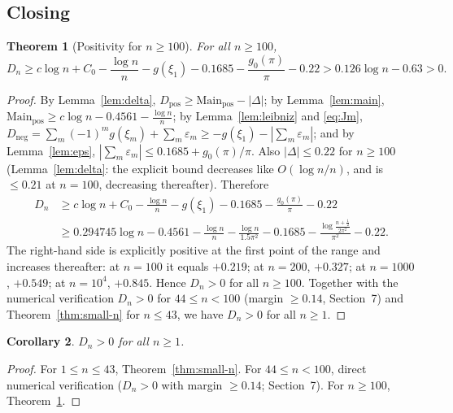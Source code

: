 \documentclass[11pt]{article}
\newtheorem{theorem}{Theorem}[section]
\newtheorem{corollary}[theorem]{Corollary}
\begin{document}
\subsection{Closing}
\label{sec:close}

\begin{theorem}[Positivity for $n\ge100$]
\label{thm:large-n}
For all $n\ge100$,
\begin{equation}\label{eq:close}
D_n\ge c\log n+C_0-\frac{\log n}{n}-g(\xi_1)-0.1685-\frac{g_0(\pi)}{\pi}-0.22
>0.126\log n-0.63>0.
\end{equation}
\end{theorem}

\begin{proof}
By Lemma~\ref{lem:delta}, $D_{\mathrm{pos}}\ge\mathrm{Main}_{\mathrm{pos}}-|\Delta|$; by
Lemma~\ref{lem:main}, $\mathrm{Main}_{\mathrm{pos}}\ge c\log n-0.4561-\frac{\log n}{n}$; by
Lemma~\ref{lem:leibniz} and \eqref{eq:Jm},
$D_{\mathrm{neg}}=\sum_m(-1)^m g(\xi_m)+\sum_m\varepsilon_m\ge-g(\xi_1)-|\sum_m\varepsilon_m|$;
and by Lemma~\ref{lem:eps}, $|\sum_m\varepsilon_m|\le0.1685+g_0(\pi)/\pi$. Also
$|\Delta|\le0.22$ for $n\ge100$ (Lemma~\ref{lem:delta}: the explicit bound decreases like
$O(\log n/n)$, and is $\le0.21$ at $n=100$, decreasing thereafter). Therefore
\begin{align*}
D_n&\ge c\log n+C_0-\frac{\log n}{n}-g(\xi_1)-0.1685-\frac{g_0(\pi)}{\pi}-0.22\\
&\ge0.294745\log n-0.4561-\frac{\log n}{n}-\frac{\log n}{1.5\pi^2}
-0.1685-\frac{\log\frac{n+\frac12}{2\pi^2}}{\pi^2}-0.22.
\end{align*}
The right-hand side is explicitly positive at the first point of the range and increases
thereafter: at $n=100$ it equals $+0.219$; at $n=200$, $+0.327$; at $n=1000$, $+0.549$;
at $n=10^4$, $+0.845$. Hence $D_n>0$ for all $n\ge100$. Together with the numerical
verification $D_n>0$ for $44\le n<100$ (margin $\ge0.14$, Section~7) and Theorem~\ref{thm:small-n}
for $n\le43$, we have $D_n>0$ for all $n\ge1$.
\end{proof}

\begin{corollary}
\label{cor:D-pos}
$D_n>0$ for all $n\ge1$.
\end{corollary}

\begin{proof}
For $1\le n\le43$, Theorem~\ref{thm:small-n}. For $44\le n<100$, direct numerical
verification ($D_n>0$ with margin $\ge0.14$; Section~7). For $n\ge100$, Theorem~\ref{thm:large-n}.
\end{proof}
\end{document}
